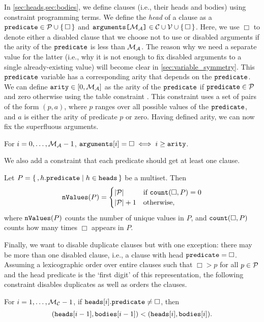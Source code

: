 In \cref{sec:heads,sec:bodies}, we define clauses (i.e., their heads and bodies)
using constraint programming terms. We define the \emph{head} of a clause as a
$\texttt{\textup{predicate}} \in \mathcal{P}{} \cup \{\, \Box \,\}$ and
$\texttt{\textup{{arguments}[}}{\mathcal{M}_{\mathcal{A}}{}}\texttt{\textup{]}} \in {\mathcal{C}{} \cup \mathcal{V}{}} \cup \{\, \Box \,\}$.
Here, we use $\Box$ to denote either a disabled clause that we choose not to use
or disabled arguments if the arity of the $\texttt{\textup{predicate}}$ is less than
$\mathcal{M}_{\mathcal{A}}{}$. The reason why we need a separate value for the latter (i.e., why
it is not enough to fix disabled arguments to a single already-existing value)
will become clear in \cref{sec:variable_symmetry}. This $\texttt{\textup{predicate}}$
variable has a corresponding arity that depends on the $\texttt{\textup{predicate}}$.
We can define $\texttt{\textup{arity}} \in [0, \mathcal{M}_{\mathcal{A}}{}]$ as the arity of the
$\texttt{\textup{predicate}}$ if $\texttt{\textup{predicate}} \in \mathcal{P}{}$ and zero
otherwise using the table constraint \citep{DBLP:conf/cpaior/MairyDL15}. This
constraint uses a set of pairs of the form $(p, a)$, where $p$ ranges over all
possible values of the $\texttt{\textup{predicate}}$, and $a$ is either the arity of
predicate $p$ or zero. Having defined arity, we can now fix the superfluous
arguments.
\begin{constraint}\label{constr:arity}
  For $i = 0, \dots, \mathcal{M}_{\mathcal{A}}{} - 1$, $\texttt{\textup{arguments}}[i] = \Box \iff i
  \ge \texttt{\textup{arity}}$.
\end{constraint}
We also add a constraint that each predicate should get at least one clause.
\begin{constraint}
  Let $P = \{\,, h.\texttt{\textup{predicate}} \mid h \in \texttt{\textup{heads}} \,\}$ be a
  multiset. Then
  \[
    \texttt{\textup{nValues}}(P) = \begin{cases}
      |\mathcal{P}{}| & \text{if } \texttt{\textup{count}}(\Box, P) = 0 \\
      |\mathcal{P}{}| + 1 & \text{otherwise,}
    \end{cases}
  \]
  where $\texttt{\textup{nValues}}(P)$ counts the number of unique values in $P$, and
  $\texttt{\textup{count}}(\Box, P)$ counts how many times $\Box$ appears in $P$.
\end{constraint}
Finally, we want to disable duplicate clauses but with one exception: there may
be more than one disabled clause, i.e., a clause with head
$\texttt{\textup{predicate}} = \Box$. Assuming a lexicographic order over entire
clauses such that $\Box > p$ for all $p \in \mathcal{P}{}$ and the head
predicate is the `first digit' of this representation, the following constraint
disables duplicates as well as orders the clauses.
\begin{constraint}
  For $i = 1, \dots, \mathcal{M}_{\mathcal{C}}{} - 1$, if $\texttt{\textup{heads}}[i].\texttt{\textup{predicate}}
  \ne \Box$, then
  \[
    (\texttt{\textup{heads}}[i-1], \texttt{\textup{bodies}}[i-1]) < (\texttt{\textup{heads}}[i],
    \texttt{\textup{bodies}}[i]).
  \]
\end{constraint}

